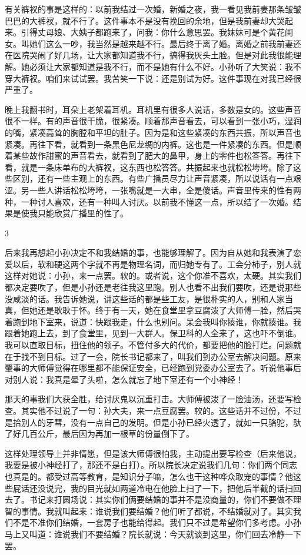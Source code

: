 有关裤衩的事是这样的：以前我结过一次婚，新婚之夜，我一看见我前妻那条皱皱巴巴的大裤衩，就不行了。这件事本不是没有挽回的余地，但是我前妻却大哭起来。引得丈母娘、大姨子都跑来了，问我：你什么意思罢。我妹妹可是个黄花闺女。叫她们这么一吵，我当然是越来越不行。最后终于离了婚。离婚之前我前妻还在医院哭闹了好几场，让大家都知道我不行，搞得我灰头土脸。但是对此我很能理解。她必须让大家都知道是我不行，而不是她有什么不好。小孙听了大笑说：我不穿大裤衩。咱们来试试罢。我苦笑一下说：还是别试为好。这件事现在对我已经很严重了。 

晚上我翻书时，耳朵上老架着耳机。耳机里有很多人说话，多数是女的。这些声音很不一样。有的声音很干脆，很紧凑。顺着那声音看去，可以看到一张小巧，湿润的嘴，紧凑高耸的胸膛和平坦的肚子。因为是和这些紧凑的东西共振，所以声音也紧凑。再往下看，就看到一条黑色尼龙绸的内裤。这也是一件紧凑的东西。但是顺着某些故作甜蜜的声音看去，就看到了肥大的鼻甲，身上的零件也松答答。再往下看，就是一条床单布的大裤衩，这东西也松答答。共振起来也就松松垮垮。除了这些区别，还有一些主观上的东西。有些广播员尽力让声音紧凑，所以说话有一点艰涩。另一些人讲话松松垮垮，一张嘴就是一大串，全是傻话。声音里传来的性有两种，一种讨人喜欢，还有一种叫人讨厌。以前我不懂这一点，所以结了一次婚。结果是使我只能欣赏广播里的性了。 

3 

后来我再想起小孙决定不和我结婚的事，也能够理解了。因为自从她和我表演了恋爱以后，软和硬这两个字就不再是物理名词，而归她专有了。工会分柿子，别人就这样对她说：小孙，来一点罢。软的。或者说，这个你准不喜欢，太硬。其实我们都决定要吹了，但是小孙还是老往我这里跑。别人也看不出我们要吹，还是说那些没咸淡的话。我告诉她说，讲这些话的都是些工友，是很朴实的人，别和人家当真，但她还是耿耿于怀。终于有一天，她在食堂里拿豆腐泼了大师傅一脸，然后哭着跑到地下室来，说道：快跟我走，什么也别问。呆会我叫你揍谁，你就揍谁。我跟着她跑上去，到了食堂里，见到一大群人。保卫科的人全来了，这也吓不倒谁。我可以直取目标，扭住他的领子。不管付多大的代价，都要把他的脸打烂。问题就在于找不到目标。过了一会，院长书记都来了，叫我们到办公室去解决问题。原来肇事的大师傅觉得在哪里都不能保证安全，已经跑到党委办公室去了。听说他事后对别人说：我真是晕了头啦，怎么就忘了地下室还有一个小神经！ 

那天的事我们大获全胜，给讨厌鬼以沉重打击。大师傅被泼了一脸油汤，还要写检查。其实他不过说了一句：孙大夫，来一点豆腐罢。软的。这些话并不过份，不过是拾别人的牙彗，没有一点自己的发明。但是小孙已经火透了，就如一只骆驼，驮了好几百公斤，最后因为再加一根草的份量倒下了。 

这样处理领导上并非情愿，但是该大师傅很怕我，主动提出要写检查（后来他说，我要是被小神经打了，那还不是白打）。所以院长决定说我们几句：你们两个同志也真是的。都受过高等教育，是知识分子嘛，怎么也干这种哗众取宠的事情？他这些屁话还没说完，我的目光就如两道冷电在他脸上扫了一下，把他后半截的话扫回去了。书记来打圆场说：其实你们俩要结婚的事并不是没商量的，你们不要做不理智的事情。我就叫起来：谁说我们要结婚？他们听了都说，不结婚就对了。其实我们不是不准你们结婚，一套房子也能给得起。我们只不过是希望你们多考虑。小孙马上又叫道：谁说我们不要结婚？院长就说：今天就谈到这里，你们回去冷静一下罢。 

